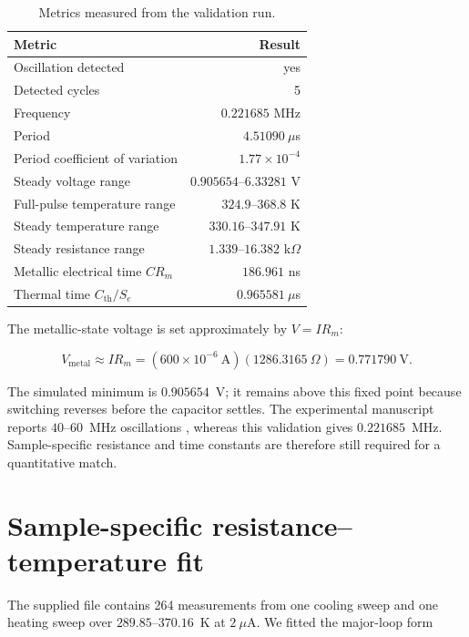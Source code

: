 \documentclass[11pt]{article}
\begin{document}
\begin{table}[H]
\centering
\small
{}
\begin{tabular}{@{}l r@{}}
\toprule
Metric & Result \\
\midrule
Oscillation detected & yes \\
Detected cycles & 5 \\
Frequency & $0.221685$ MHz \\
Period & $4.51090~\mu$s \\
Period coefficient of variation & $1.77\times10^{-4}$ \\
Steady voltage range & $0.905654$--$6.33281$ V \\
Full-pulse temperature range & $324.9$--$368.8$ K \\
Steady temperature range & $330.16$--$347.91$ K \\
Steady resistance range & $1.339$--$16.382$ k$\Omega$ \\
Metallic electrical time $C R_m$ & $186.961$ ns \\
Thermal time $C_{\mathrm{th}}/S_e$ & $0.965581~\mu$s \\
\bottomrule
\end{tabular}
\caption{Metrics measured from the validation run.}
\label{tab:validation_results}
\end{table}

The metallic-state voltage is set approximately by $V=IR_m$:

\begin{equation}
V_{\mathrm{metal}}\approx I R_m
=(600\times10^{-6}\ \mathrm{A})(1286.3165\ \Omega)
=0.771790\ \mathrm{V}.
\label{eq:metal_floor}
\end{equation}

The simulated minimum is $0.905654$~V; it remains above this fixed point because switching reverses before the capacitor settles. The experimental manuscript reports $40$--$60$~MHz oscillations \cite{gildor2026}, whereas this validation gives $0.221685$~MHz. Sample-specific resistance and time constants are therefore still required for a quantitative match.

\section{Sample-specific resistance--temperature fit}

The supplied file contains 264 measurements from one cooling sweep and one heating sweep over $289.85$--$370.16$~K at $2~\mu$A. We fitted the major-loop form
\end{document}
